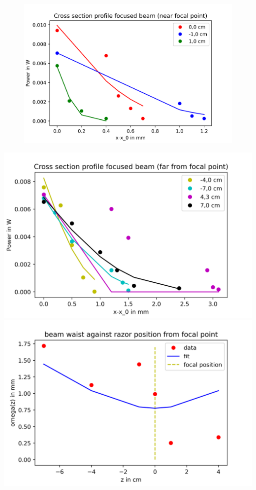\documentclass{article}
\begin{document}
\begin{figure}
\includegraphics[width=\textwidth]{Cross section profile focused beam (near focal point).png} 
\label{near_focal} 
\end{figure}

\includegraphics[width=\textwidth]{Cross section profile focused beam (far from focal point).png}
\includegraphics[width=\textwidth]{beam waist against razor position from focal point.png}
\end{document}
